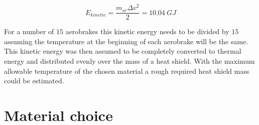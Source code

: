 \begin{equation}
	E_{kinetic} = \frac{m_{sc}\Delta v^2}{2} = 10.04\ GJ
\end{equation}

For a number of $15$ aerobrakes this kinetic energy needs to be divided by $15$ assuming the temperature at the beginning of each aerobrake will be the same.  This kinetic energy was then assumed to be completely converted to thermal energy and distributed evenly over the mass of a heat shield. With the maximum allowable temperature of the chosen material a rough required heat shield mass could be estimated.

\section{Material choice}

